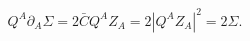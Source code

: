 \begin{equation}
 Q^A \partial_A \Sigma = 2 \bar{C} Q^A Z_A = 2 |Q^A Z_A|^2 = 2 \Sigma.
\end{equation}

